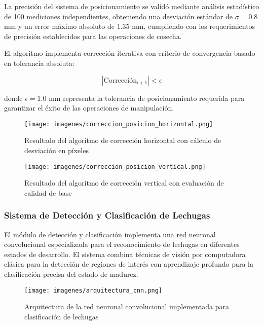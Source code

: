 La precisión del sistema de posicionamiento se validó mediante análisis estadístico de 100 mediciones independientes, obteniendo una desviación estándar de $\sigma = 0.8$ mm y un error máximo absoluto de $1.35$ mm, cumpliendo con los requerimientos de precisión establecidos para las operaciones de cosecha.

El algoritmo implementa corrección iterativa con criterio de convergencia basado en tolerancia absoluta:

\begin{equation}
|\text{Corrección}_{i+1}| < \epsilon
\end{equation}

donde $\epsilon = 1.0$ mm representa la tolerancia de posicionamiento requerida para garantizar el éxito de las operaciones de manipulación.

\begin{figure}[h]
\centering
\texttt{[image: imagenes/correccion\_posicion\_horizontal.png]}
\caption{Resultado del algoritmo de corrección horizontal con cálculo de desviación en píxeles}
\label{fig:correccion_horizontal}
\end{figure}

\begin{figure}[h]
\centering
\texttt{[image: imagenes/correccion\_posicion\_vertical.png]}
\caption{Resultado del algoritmo de corrección vertical con evaluación de calidad de base}
\label{fig:correccion_vertical}
\end{figure}

\subsubsection{Sistema de Detección y Clasificación de Lechugas}

El módulo de detección y clasificación implementa una red neuronal convolucional especializada para el reconocimiento de lechugas en diferentes estados de desarrollo. El sistema combina técnicas de visión por computadora clásica para la detección de regiones de interés con aprendizaje profundo para la clasificación precisa del estado de madurez.

\begin{figure}[h]
\centering
\texttt{[image: imagenes/arquitectura\_cnn.png]}
\caption{Arquitectura de la red neuronal convolucional implementada para clasificación de lechugas}
\label{fig:arquitectura_cnn}
\end{figure}

